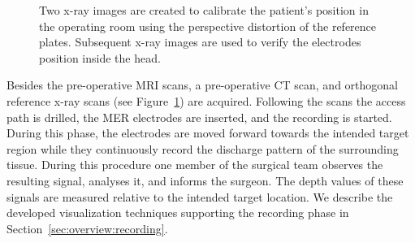 \documentclass[review]{vgtc}                 %
\begin{document}

\begin{figure}[b]
    \centering
    \hspace*{0.1cm}
    \caption{Two x-ray images are created to calibrate the patient's position in the operating room using the perspective distortion of the reference plates. Subsequent x-ray images are used to verify the electrodes position inside the head.}
    \label{fig:xrayreferencescans}
\end{figure}

Besides the pre-operative MRI scans, a pre-operative CT scan, and orthogonal reference x-ray scans  (see Figure~\ref{fig:xrayreferencescans}) are acquired. Following the scans the access path is drilled, the MER electrodes are inserted, and the recording is started. During this phase, the electrodes are moved forward towards the intended target region while they continuously record the discharge pattern of the surrounding tissue. During this procedure one member of the surgical team observes the resulting signal, analyses it, and informs the surgeon. The depth values of these signals are measured relative to the intended target location. We describe the developed visualization techniques supporting the recording phase in Section~\ref{sec:overview:recording}.
\end{document}
